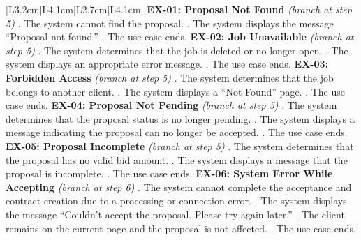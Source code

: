 \begin{longtable}{|L{3.2cm}|L{4.1cm}|L{2.7cm}|L{4.1cm}|}
{\textbf{EX-01: Proposal Not Found} \textit{(branch at step 5)} . The system cannot find the proposal. . The system displays the message ``Proposal not found.'' . The use case ends. \newline
\textbf{EX-02: Job Unavailable} \textit{(branch at step 5)} . The system determines that the job is deleted or no longer open. . The system displays an appropriate error message. . The use case ends. \newline
\textbf{EX-03: Forbidden Access} \textit{(branch at step 5)} . The system determines that the job belongs to another client. . The system displays a ``Not Found'' page. . The use case ends. \newline
\textbf{EX-04: Proposal Not Pending} \textit{(branch at step 5)} . The system determines that the proposal status is no longer pending. . The system displays a message indicating the proposal can no longer be accepted. . The use case ends. \newline
\textbf{EX-05: Proposal Incomplete} \textit{(branch at step 5)} . The system determines that the proposal has no valid bid amount. . The system displays a message that the proposal is incomplete. . The use case ends. \newline
\textbf{EX-06: System Error While Accepting} \textit{(branch at step 6)} . The system cannot complete the acceptance and contract creation due to a processing or connection error. . The system displays the message ``Couldn't accept the proposal. Please try again later.'' . The client remains on the current page and the proposal is not affected. . The use case ends.
} \\ \hline


\end{longtable}
